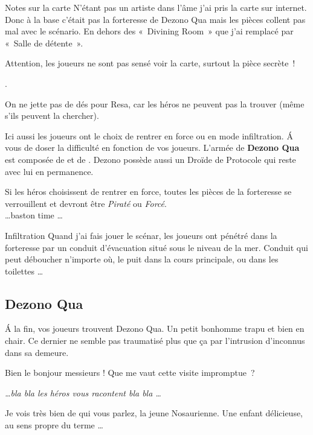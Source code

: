 \documentclass{jdrp}
\begin{document}
	\begin{paperbox}{Notes sur la carte}
	N'étant pas un artiste dans l’âme j’ai pris la carte sur internet. Donc à la base c’était pas la forteresse de Dezono Qua mais les pièces collent pas mal avec le scénario. En dehors des «~Divining Room~» que j’ai remplacé par «~Salle de détente~».

	Attention, les joueurs ne sont pas sensé voir la carte, surtout la pièce secrète~!

	\cite{sirinkman-deviantart}.
	\end{paperbox}

	On ne jette pas de dés pour Resa, car les héros ne peuvent pas la trouver (même s’ils peuvent la chercher). 

	Ici aussi les joueurs ont le choix de rentrer en force ou en mode infiltration. \'A vous de doser la difficulté en fonction de vos joueurs. L’armée de \textbf{Dezono Qua} est composée de  et de . Dezono possède aussi un Droïde de Protocole qui reste avec lui en permanence.

	Si les héros choisissent de rentrer en force, toutes les pièces de la forteresse se verrouillent et devront être \textit{Piraté} ou \textit{Forcé}.\\

	\ldots baston time \ldots \\

	\begin{paperbox}{Infiltration}
		Quand j’ai fais jouer le scénar, les joueurs ont pénétré dans la forteresse par un conduit d’évacuation situé sous le niveau de la mer. Conduit qui peut déboucher n’importe où, le puit dans la cours principale, ou dans les toilettes \ldots
	\end{paperbox}

	\subsection{Dezono Qua}
	\'A la fin, vos joueurs trouvent Dezono Qua. Un petit bonhomme trapu et bien en chair. Ce dernier ne semble pas traumatisé plus que ça par l’intrusion d’inconnus dans sa demeure.

	\begin{quotebox}
    	Bien le bonjour messieurs ! Que me vaut cette visite impromptue~?

    	\textit{\ldots bla bla les héros vous racontent bla bla \ldots}

    	Je vois très bien de qui vous parlez, la jeune Nosaurienne. Une enfant délicieuse, au sens propre du terme \ldots
	\end{quotebox}
\end{document}

